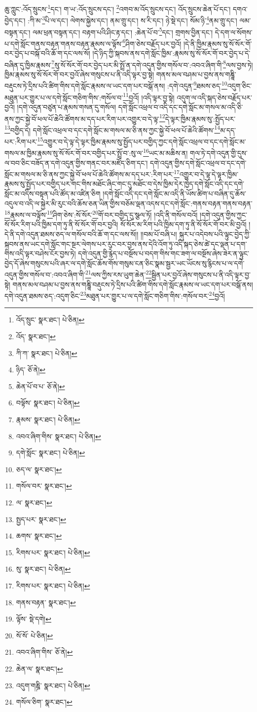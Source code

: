 ཆུ་ཀླུང་:འོད་སྲུངས་\footnote{འོད་སྲུང་  སྣར་ཐང་།  པེ་ཅིན། }དང་། ག་ཡ་:འོད་སྲུངས་དང་། \footnote{འོད་  སྣར་ཐང་། }འགབ་མ་འོད་སྲུངས་དང་། འོད་སྲུངས་ཆེན་པོ་དང་། དགའ་བྱེད་དང་། :ཀི་མ་\footnote{ཀི་ཀ་  སྣར་ཐང་།  པེ་ཅིན། }པི་ལ་དང་། ལེགས་སྐྱེས་དང་། ནམ་གྲུ་དང་། ས་རི་དང་། ཉེ་སྡེ་དང་། སོམ་ཉི་\footnote{ཉིད་  ཅོ་ནེ། }ནམ་གྲུ་དང་། ལམ་བསྟན་དང་། ལམ་ཕྲན་བསྟན་དང་། བརྟག་པའི་ཤིང་རྟ་དང་། :ཆེན་པོ་བ་\footnote{ཆེན་པོ་བ་པ་  ཅོ་ནེ། }དང་། གྲགས་བྱིན་དང་། དེ་དག་ལ་སོགས་པ་དགེ་སློང་གནས་བརྟན་གནས་བརྟན་རྣམས་ལ་ལྟོས་\footnote{བལྟོས་  སྣར་ཐང་།  པེ་ཅིན། }ཤིག་ཅེས་བརྗོད་པར་བྱའོ། །དེ་ནི་ཁྱིམ་རྣམས་སུ་སོ་སོར་གོ་བར་བྱེད་པ་བསྐོ་བའི་ཆོ་ག་དང་ལས་སོ། །དེ་ཉིད་ཀྱི་སྐབས་ནས་དགེ་སློང་ཁྱིམ་:རྣམས་སུ་སོ་སོར་གོ་བར་བྱེད་པ་དེ་བཞིན་དུ་ཁྱིམ་རྣམས་\footnote{རྣམས་  སྣར་ཐང་།  པེ་ཅིན། }སུ་སོ་སོར་གོ་བར་བྱེད་པར་མི་སྤྲོ་ན་དགེ་འདུན་གྱིས་གསོལ་བ་:འབའ་ཞིག་གི་\footnote{འབའ་ཞིག་གིས་  སྣར་ཐང་།  པེ་ཅིན། }ལས་བྱས་ཏེ། ཁྱིམ་རྣམས་སུ་སོ་སོར་གོ་བར་བྱའོ་ཞེས་གསུངས་པ་ནི་འདི་ལྟར་བྱ་སྟེ། གནས་མལ་བཤམ་པ་བྱས་ནས་གཎྜཱི་བརྡུངས་ཏེ་དྲིས་པའི་ཚིག་གིས་དགེ་སློང་རྣམས་ལ་ཡང་དག་པར་བསྒོ་ནས། :དགེ་འདུན་\footnote{དགེ་སློང་  སྣར་ཐང་།  པེ་ཅིན། }ཐམས་ཅད་\footnote{ཅད་ལ་  སྣར་ཐང་། }འདུག་ཅིང་མཐུན་པར་གྱུར་པ་ལ་དགེ་སློང་གཅིག་གིས་:གསོལ་བ་\footnote{གསོལ་བར་  སྣར་ཐང་། }བྱའོ། །འདི་ལྟར་བྱ་སྟེ། འདུག་ལ་འདི་སྐད་ཅེས་བརྗོད་པར་བྱའོ། །དགེ་འདུན་བཙུན་པ་རྣམས་གསན་དུ་གསོལ། དགེ་སློང་འཕྲལ་བ་འདི་དང་དགེ་སློང་མ་གསལ་མ་འདི་ཅི་ནས་ཀྱང་སྐྱེ་བོ་ཕལ་པོ་ཆེའི་ཚོགས་མ་དད་པར་རིག་པར་འགྱུར་བ་དེ་ལྟ་\footnote{ལ་  སྣར་ཐང་། }དེ་ལྟར་ཁྱིམ་རྣམས་སུ་:སྤྱོད་པར་\footnote{སྤྱད་པར་  སྣར་ཐང་། }བགྱིད་དེ། དགེ་སློང་འཕྲལ་བ་དང་དགེ་སློང་མ་གསལ་མ་ཅི་ནས་ཀྱང་སྐྱེ་བོ་ཕལ་པོ་ཆེའི་ཚོགས་\footnote{ཆགས་  སྣར་ཐང་། }མ་དད་པར་:རིག་པར་\footnote{རིགས་པར་  སྣར་ཐང་།  པེ་ཅིན། }འགྱུར་བ་དེ་ལྟ་དེ་ལྟར་ཁྱིམ་རྣམས་སུ་སྤྱོད་པར་བགྱིད་ཀྱང་དགེ་སློང་འཕྲལ་བ་དང་དགེ་སློང་མ་གསལ་མ་ཁྱིམ་རྣམས་སུ་སོ་སོར་གོ་བར་བགྱིད་པར་སྤྲོ་བ་:སུ་ལ་\footnote{སུ་  སྣར་ཐང་།  པེ་ཅིན། }ཡང་མ་མཆིས་ན། གལ་ཏེ་དགེ་འདུན་གྱི་དུས་ལ་བབ་ཅིང་བཟོད་ན་དགེ་འདུན་གྱིས་གནང་བར་མཛོད་ཅིག་དང་། དགེ་འདུན་གྱིས་དགེ་སློང་འཕྲལ་བ་དང་དགེ་སློང་མ་གསལ་མ་ཅི་ནས་ཀྱང་སྐྱེ་བོ་ཕལ་པོ་ཆེའི་ཚོགས་མ་དད་པར་:རིག་པར་\footnote{རིགས་པར་  སྣར་ཐང་།  པེ་ཅིན། }འགྱུར་བ་དེ་ལྟ་དེ་ལྟར་ཁྱིམ་རྣམས་སུ་སྤྱོད་པར་བགྱིད་པར་གང་གིས་མཐོང་ཞིང་གང་དུ་མཐོང་བ་དེས་ཁྱིམ་དེར་ཁྱེད་དགེ་སློང་འདི་དང་དགེ་སློང་མ་འདིས་བསྟན་པའི་ཚོད་མ་འཛིན་ཅིག །དགེ་སློང་འདི་དང་དགེ་སློང་མ་འདི་ནི་ཡོས་ཚིག་པ་བཞིན་དུ་ཆོས་འདུལ་བ་འདི་ལ་སྐྱེར་མི་རུང་བའི་ཆོས་ཅན་ཡིན་གྱིས་བཅོམ་ལྡན་འདས་དང་དགེ་སློང་:གནས་བརྟན་གནས་བརྟན་\footnote{གནས་བརྟན་  སྣར་ཐང་། }རྣམས་ལ་བལྟོས་\footnote{ལྟོས་  སྡེ་དགེ། }ཤིག་ཅེས་:སོ་སོར་\footnote{སོ་སོ་  པེ་ཅིན། }གོ་བར་བགྱིད་དུ་སྩལ་ཏོ། །འདི་ནི་གསོལ་བའོ། །དགེ་འདུན་གྱིས་ཀྱང་སོ་སོར་རིག་པའི་ཁྱིམ་དག་ཏུ་ནི་སོ་སོར་གོ་བར་བྱའི། སོ་སོར་མ་རིག་པའི་ཁྱིམ་དག་ཏུ་ནི་སོ་སོར་གོ་བར་མི་བྱའོ། །དེ་ནི་དགེ་འདུན་ཐམས་ཅད་ལ་གསོལ་བའི་ཆོ་ག་དང་ལས་སོ།། །།བམ་པོ་བཞི་པ། སྐུར་པ་འདེབས་པའི་ལྟུང་བྱེད་ཀྱི་སྐབས་ནས་ཡང་དགེ་སློང་གང་སྔར་ལེགས་པར་རུང་བར་བྱས་ནས་དེའི་འོག་ཏུ་འདི་སྐད་ཅེས་ཚེ་དང་ལྡན་པ་དག་གིས་འདི་ལྟར་བཤེས་ངོར་བྱས་ཏེ། དགེ་འདུན་གྱི་རྙེད་པ་བསྔོས་པ་བདག་གིས་གང་ཟག་ལ་བསྔོས་ཞེས་ཟེར་ན་ལྟུང་བྱེད་དོ་ཞེས་གསུངས་པའི་ཞར་ལ་དགེ་སློང་ཆོས་གོས་གསུམ་ངན་ཅིང་སྣམ་སྦྱར་ཡང་ཡོངས་སུ་རྙིངས་པ་ལ་དགེ་འདུན་གྱིས་གསོལ་བ་:འབའ་ཞིག་གི་\footnote{འབའ་ཞིག་གིས་  ཅོ་ནེ། }ལས་ཀྱིས་རས་ཡུག་ཆེན་\footnote{ཆེན་ལ་  སྣར་ཐང་། }སྦྱིན་པར་བྱའོ་ཞེས་གསུངས་པ་ནི་འདི་ལྟར་བྱ་སྟེ། གནས་མལ་བཤམ་པ་བྱས་ནས་གཎྜཱི་བརྡུངས་ཏེ་དྲིས་པའི་ཚིག་གིས་དགེ་སློང་རྣམས་ལ་ཡང་དག་པར་བསྒོ་ནས། དགེ་འདུན་ཐམས་ཅད་:འདུག་ཅིང་\footnote{འདུག་གཎྜི་  སྣར་ཐང་།  པེ་ཅིན། }མཐུན་པར་གྱུར་པ་ལ་དགེ་སློང་གཅིག་གིས་:གསོལ་བར་\footnote{གསོལ་ཅིག་  སྣར་ཐང་། }བྱའོ། 